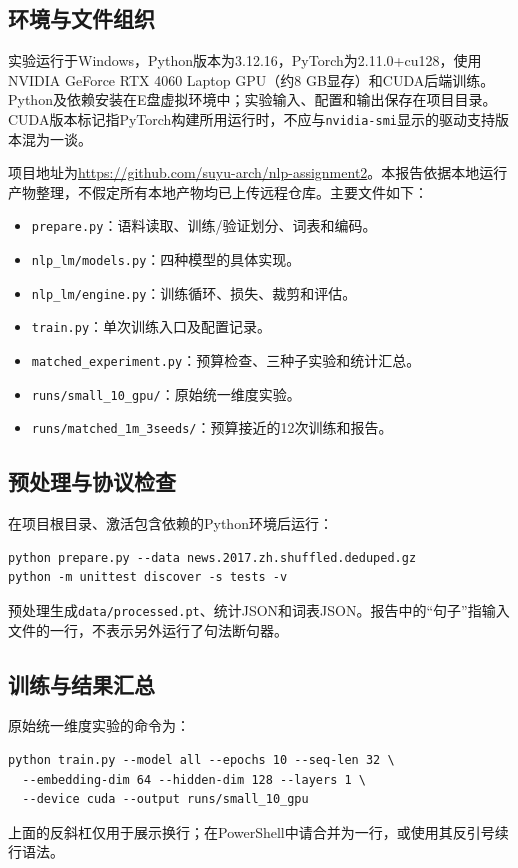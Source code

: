 ﻿\documentclass[UTF8,a4paper,12pt]{ctexart}
\begin{document}
\subsection{环境与文件组织}
实验运行于Windows，Python版本为3.12.16，PyTorch为2.11.0+cu128，使用NVIDIA GeForce RTX 4060 Laptop GPU（约8 GB显存）和CUDA后端训练。Python及依赖安装在E盘虚拟环境中；实验输入、配置和输出保存在项目目录。CUDA版本标记指PyTorch构建所用运行时，不应与\texttt{nvidia-smi}显示的驱动支持版本混为一谈。

项目地址为\url{https://github.com/suyu-arch/nlp-assignment2}。本报告依据本地运行产物整理，不假定所有本地产物均已上传远程仓库。主要文件如下：
\begin{itemize}[leftmargin=2em]
\item \nolinkurl{prepare.py}：语料读取、训练/验证划分、词表和编码。
\item \nolinkurl{nlp_lm/models.py}：四种模型的具体实现。
\item \nolinkurl{nlp_lm/engine.py}：训练循环、损失、裁剪和评估。
\item \nolinkurl{train.py}：单次训练入口及配置记录。
\item \nolinkurl{matched_experiment.py}：预算检查、三种子实验和统计汇总。
\item \nolinkurl{runs/small_10_gpu/}：原始统一维度实验。
\item \nolinkurl{runs/matched_1m_3seeds/}：预算接近的12次训练和报告。
\end{itemize}

\subsection{预处理与协议检查}
在项目根目录、激活包含依赖的Python环境后运行：
\begin{verbatim}
python prepare.py --data news.2017.zh.shuffled.deduped.gz
python -m unittest discover -s tests -v
\end{verbatim}
预处理生成\nolinkurl{data/processed.pt}、统计JSON和词表JSON。报告中的“句子”指输入文件的一行，不表示另外运行了句法断句器。

\subsection{训练与结果汇总}
原始统一维度实验的命令为：
\begin{verbatim}
python train.py --model all --epochs 10 --seq-len 32 \
  --embedding-dim 64 --hidden-dim 128 --layers 1 \
  --device cuda --output runs/small_10_gpu
\end{verbatim}
上面的反斜杠仅用于展示换行；在PowerShell中请合并为一行，或使用其反引号续行语法。
\end{document}
